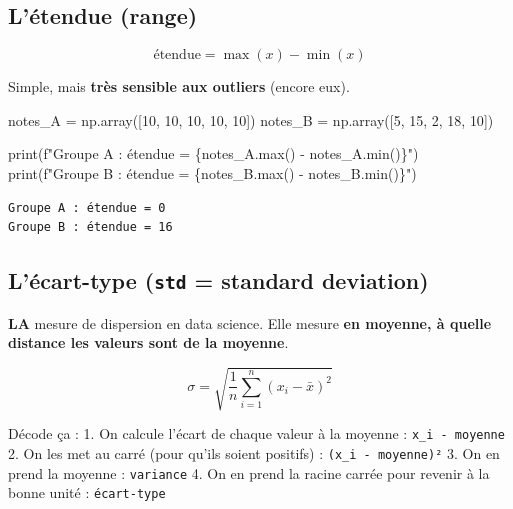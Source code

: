 \documentclass[
  french,
  11pt,
  a4paper,
]{scrbook}
\newenvironment{Shaded}{}{}
\newcommand{\BuiltInTok}[1]{\textcolor[rgb]{0.84,0.23,0.29}{#1}}
\newcommand{\DecValTok}[1]{\textcolor[rgb]{0.00,0.36,0.77}{#1}}
\newcommand{\NormalTok}[1]{\textcolor[rgb]{0.14,0.16,0.18}{#1}}
\newcommand{\OperatorTok}[1]{\textcolor[rgb]{0.14,0.16,0.18}{#1}}
\newcommand{\SpecialCharTok}[1]{\textcolor[rgb]{0.00,0.36,0.77}{#1}}
\newcommand{\SpecialStringTok}[1]{\textcolor[rgb]{0.01,0.18,0.38}{#1}}
\begin{document}
\subsection{L'étendue (range)}\label{luxe9tendue-range}

\[\text{étendue} = \max(x) - \min(x)\]

Simple, mais \textbf{très sensible aux outliers} (encore eux).

\begin{Shaded}
\begin{Highlighting}[]
\NormalTok{notes\_A }\OperatorTok{=}\NormalTok{ np.array([}\DecValTok{10}\NormalTok{, }\DecValTok{10}\NormalTok{, }\DecValTok{10}\NormalTok{, }\DecValTok{10}\NormalTok{, }\DecValTok{10}\NormalTok{])}
\NormalTok{notes\_B }\OperatorTok{=}\NormalTok{ np.array([}\DecValTok{5}\NormalTok{, }\DecValTok{15}\NormalTok{, }\DecValTok{2}\NormalTok{, }\DecValTok{18}\NormalTok{, }\DecValTok{10}\NormalTok{])}

\BuiltInTok{print}\NormalTok{(}\SpecialStringTok{f"Groupe A : étendue = }\SpecialCharTok{\{}\NormalTok{notes\_A}\SpecialCharTok{.}\BuiltInTok{max}\NormalTok{() }\OperatorTok{{-}}\NormalTok{ notes\_A}\SpecialCharTok{.}\BuiltInTok{min}\NormalTok{()}\SpecialCharTok{\}}\SpecialStringTok{"}\NormalTok{)}
\BuiltInTok{print}\NormalTok{(}\SpecialStringTok{f"Groupe B : étendue = }\SpecialCharTok{\{}\NormalTok{notes\_B}\SpecialCharTok{.}\BuiltInTok{max}\NormalTok{() }\OperatorTok{{-}}\NormalTok{ notes\_B}\SpecialCharTok{.}\BuiltInTok{min}\NormalTok{()}\SpecialCharTok{\}}\SpecialStringTok{"}\NormalTok{)}
\end{Highlighting}
\end{Shaded}

\begin{verbatim}
Groupe A : étendue = 0
Groupe B : étendue = 16
\end{verbatim}

\subsection{\texorpdfstring{L'écart-type (\texttt{std} = standard
deviation)}{L'écart-type (std = standard deviation)}}\label{luxe9cart-type-std-standard-deviation}

\textbf{LA} mesure de dispersion en data science. Elle mesure \textbf{en
moyenne, à quelle distance les valeurs sont de la moyenne}.

\[\sigma = \sqrt{\frac{1}{n} \sum_{i=1}^{n} (x_i - \bar{x})^2}\]

Décode ça : 1. On calcule l'écart de chaque valeur à la moyenne :
\texttt{x\_i\ -\ moyenne} 2. On les met au carré (pour qu'ils soient
positifs) : \texttt{(x\_i\ -\ moyenne)²} 3. On en prend la moyenne :
\texttt{variance} 4. On en prend la racine carrée pour revenir à la
bonne unité : \texttt{écart-type}
\end{document}
